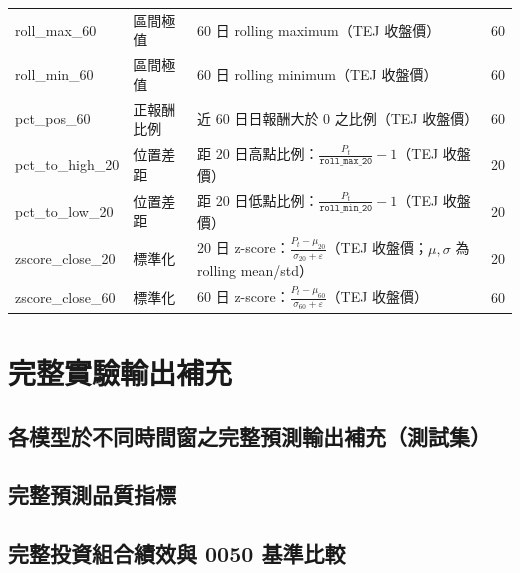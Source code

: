 \begin{longtable}{p{3.1cm} p{2.6cm} p{7.4cm} p{1.6cm}}
roll\_max\_60 & 區間極值 & 60 日 rolling maximum（TEJ 收盤價） & 60 \\
roll\_min\_60 & 區間極值 & 60 日 rolling minimum（TEJ 收盤價） & 60 \\
pct\_pos\_60  & 正報酬比例 & 近 60 日日報酬大於 0 之比例（TEJ 收盤價） & 60 \\

pct\_to\_high\_20 & 位置差距 & 距 20 日高點比例：$\frac{P_t}{\texttt{roll\_max\_20}}-1$（TEJ 收盤價） & 20 \\
pct\_to\_low\_20  & 位置差距 & 距 20 日低點比例：$\frac{P_t}{\texttt{roll\_min\_20}}-1$（TEJ 收盤價） & 20 \\

zscore\_close\_20 & 標準化 & 20 日 z-score：$\frac{P_t-\mu_{20}}{\sigma_{20}+\varepsilon}$（TEJ 收盤價；$\mu,\sigma$ 為 rolling mean/std） & 20 \\
zscore\_close\_60 & 標準化 & 60 日 z-score：$\frac{P_t-\mu_{60}}{\sigma_{60}+\varepsilon}$（TEJ 收盤價） & 60 \\

\end{longtable}
\renewcommand{\arraystretch}{1.0}


\section{完整實驗輸出補充}
\label{sec:appendix_extra_outputs}

\subsection{各模型於不同時間窗之完整預測輸出補充（測試集）}



\clearpage
\subsection{完整預測品質指標}
\label{subsec:appendix_prediction_quality_full}



\clearpage
\subsection{完整投資組合績效與 0050 基準比較}
\label{subsec:appendix_portfolio_0050_full}




